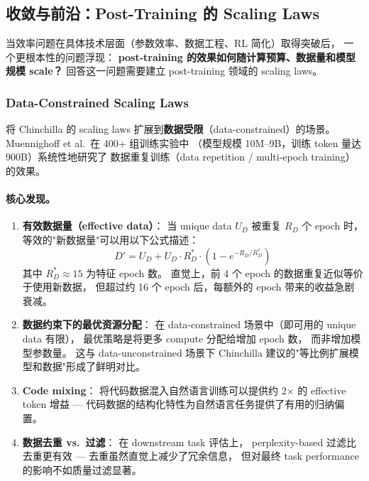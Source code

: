 
\subsection{收敛与前沿：Post-Training 的 Scaling Laws}
\label{sec:t7-scaling}

当效率问题在具体技术层面（参数效率、数据工程、RL 简化）取得突破后，
一个更根本性的问题浮现：
\textbf{post-training 的效果如何随计算预算、数据量和模型规模 scale？}
回答这一问题需要建立 post-training 领域的 scaling laws。

\subsubsection{Data-Constrained Scaling Laws}
\label{sec:t7-scaling-data}

 将 Chinchilla 的 scaling laws
扩展到\textbf{数据受限}（data-constrained）的场景。
Muennighoff et al.\ 在 400+ 组训练实验中
（模型规模 10M--9B，训练 token 量达 900B）系统性地研究了
数据重复训练（data repetition / multi-epoch training）的效果。

\paragraph{核心发现。}
\begin{enumerate}[leftmargin=2em]
  \item \textbf{有效数据量（effective data）}：
    当 unique data $U_D$ 被重复 $R_D$ 个 epoch 时，
    等效的"新数据量"可以用以下公式描述：
    \begin{equation}
    D' = U_D + U_D \cdot R_D^* \cdot \left(1 - e^{-R_D / R_D^*}\right)
    \label{eq:effective-data}
    \end{equation}
    其中 $R_D^* \approx 15$ 为特征 epoch 数。
    直觉上，前 4 个 epoch 的数据重复近似等价于使用新数据，
    但超过约 16 个 epoch 后，每额外的 epoch 带来的收益急剧衰减。

  \item \textbf{数据约束下的最优资源分配}：
    在 data-constrained 场景中（即可用的 unique data 有限），
    最优策略是将更多 compute 分配给增加 epoch 数，
    而非增加模型参数量。
    这与 data-unconstrained 场景下
    Chinchilla 建议的"等比例扩展模型和数据"形成了鲜明对比。

  \item \textbf{Code mixing}：
    将代码数据混入自然语言训练可以提供约 2$\times$ 的
    effective token 增益 ---
    代码数据的结构化特性为自然语言任务提供了有用的归纳偏置。

  \item \textbf{数据去重 vs.\ 过滤}：
    在 downstream task 评估上，
    perplexity-based 过滤比去重更有效 ---
    去重虽然直觉上减少了冗余信息，
    但对最终 task performance 的影响不如质量过滤显著。
\end{enumerate}

